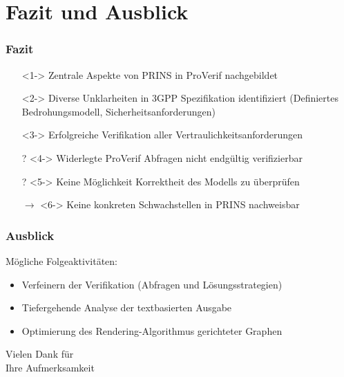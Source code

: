 \documentclass{beamer}
\begin{document}
\section{Fazit und Ausblick}

\begin{frame}
    \frametitle{Fazit}

    \begin{itemize}
        \item[\checkmark]<1-> Zentrale Aspekte von PRINS in ProVerif nachgebildet
        \vspace*{2mm}
        \item[\checkmark]<2-> Diverse Unklarheiten in 3GPP Spezifikation identifiziert
        (Definiertes Bedrohungsmodell, Sicherheitsanforderungen)
        \vspace*{2mm}
        \item[\checkmark]<3-> Erfolgreiche Verifikation aller Vertraulichkeitsanforderungen
        \vspace*{2mm}
        \item[?]<4-> Widerlegte ProVerif Abfragen nicht endgültig verifizierbar
        \vspace*{2mm}
        \item[?]<5-> Keine Möglichkeit Korrektheit des Modells zu überprüfen
        \vspace*{2mm}
        \item[$\rightarrow$]<6-> Keine konkreten Schwachstellen in PRINS nachweisbar
    \end{itemize}
\end{frame}

\begin{frame}
    \frametitle{Ausblick}
    Mögliche Folgeaktivitäten:
    \vspace*{2mm}
    \begin{itemize}
        \item Verfeinern der Verifikation (Abfragen und Lösungsstrategien)
        \vspace*{2mm}
        \item Tiefergehende Analyse der textbasierten Ausgabe
        \vspace*{2mm}
        \item Optimierung des Rendering-Algorithmus gerichteter Graphen
    \end{itemize}
\end{frame}

\begin{frame}
    \centering
    \huge
    Vielen Dank für\\Ihre Aufmerksamkeit
\end{frame}
\end{document}
